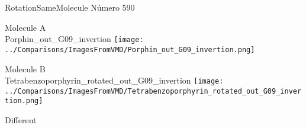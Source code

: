 \vtab[-3cm]
\begin{center}
{\large RotationSameMolecule \tab Número 590}
\end{center}
\begin{multicols}{2}
\begin{center}
Molecule A \\ 
Porphin\_out\_G09\_invertion
\texttt{[image: ../Comparisons/ImagesFromVMD/Porphin\_out\_G09\_invertion.png]}
\\
\vtab

\columnbreak
Molecule B \\ 
Tetrabenzoporphyrin\_rotated\_out\_G09\_invertion
\texttt{[image: ../Comparisons/ImagesFromVMD/Tetrabenzoporphyrin\_rotated\_out\_G09\_invertion.png]}
\\
\vtab


\end{center}
\end{multicols}
\begin{center}
\textcolor{NavyBlue}{\Large Different}
\end{center}

 \newpage

